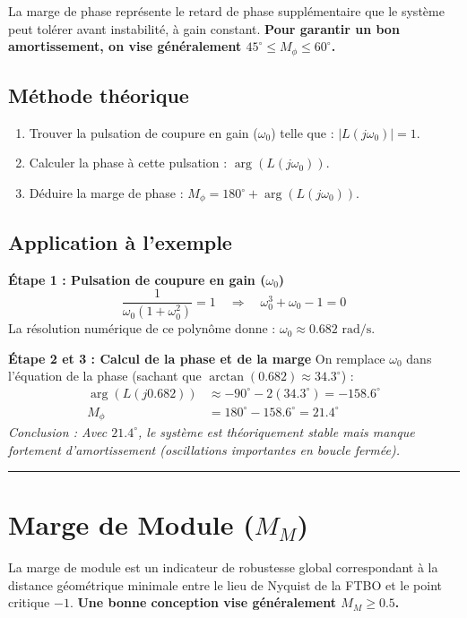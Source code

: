 \documentclass[12pt, a4paper]{article}
\begin{document}
La marge de phase représente le retard de phase supplémentaire que le système peut tolérer avant instabilité, à gain constant. \textbf{Pour garantir un bon amortissement, on vise généralement $45^\circ \leq M_\phi \leq 60^\circ$.}

\subsection{Méthode théorique}
\begin{enumerate}
    \item Trouver la pulsation de coupure en gain ($\omega_0$) telle que : $|L(j\omega_0)| = 1$.
    \item Calculer la phase à cette pulsation : $\arg(L(j\omega_0))$.
    \item Déduire la marge de phase : $M_\phi = 180^\circ + \arg(L(j\omega_0))$.
\end{enumerate}

\subsection{Application à l'exemple}
\textbf{Étape 1 : Pulsation de coupure en gain ($\omega_0$)}
\begin{equation*}
    \frac{1}{\omega_0(1+\omega_0^2)} = 1 \quad \Longrightarrow \quad \omega_0^3 + \omega_0 - 1 = 0
\end{equation*}
La résolution numérique de ce polynôme donne : $\omega_0 \approx 0.682 \text{ rad/s}$.

\textbf{Étape 2 et 3 : Calcul de la phase et de la marge}
On remplace $\omega_0$ dans l'équation de la phase (sachant que $\arctan(0.682) \approx 34.3^\circ$) :
\begin{align*}
    \arg(L(j0.682)) &\approx -90^\circ - 2(34.3^\circ) = -158.6^\circ \\
    M_\phi &= 180^\circ - 158.6^\circ = 21.4^\circ
\end{align*}
\textit{Conclusion : Avec $21.4^\circ$, le système est théoriquement stable mais manque fortement d'amortissement (oscillations importantes en boucle fermée).}

\rule{\linewidth}{0.5pt}

\section{Marge de Module ($M_M$)}

La marge de module est un indicateur de robustesse global correspondant à la distance géométrique minimale entre le lieu de Nyquist de la FTBO et le point critique $-1$. \textbf{Une bonne conception vise généralement $M_M \geq 0.5$.}
\end{document}
